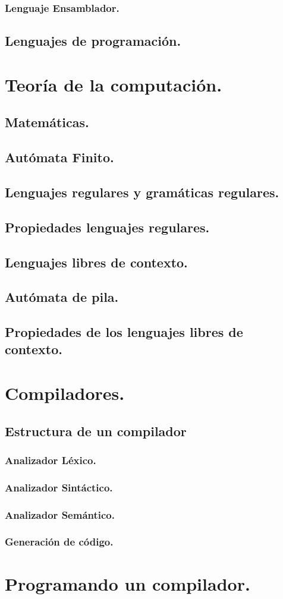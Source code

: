 \documentclass[12pt,letterpaper,openright]{article}
\begin{document}
		\subsubsection{Lenguaje Ensamblador.}
	\subsection{Lenguajes de programación.}
\newpage	
\section{Teoría de la computación.}
	 \subsection{Matemáticas.}
	 \subsection{Autómata Finito.}
	 \subsection{Lenguajes regulares y gramáticas regulares.}
	 \subsection{Propiedades lenguajes regulares.}
	 \subsection{Lenguajes libres de contexto.}
	 \subsection{Autómata de pila.}
	 \subsection{Propiedades de los lenguajes libres de contexto.}
\newpage
\section{Compiladores.}
	\subsection{Estructura de un compilador}
		\subsubsection{Analizador Léxico.}
		\subsubsection{Analizador Sintáctico.}
		\subsubsection{Analizador Semántico.}
		\subsubsection{Generación de código.}
		
\newpage
\section{Programando un compilador.}

%
%
\end{document}
